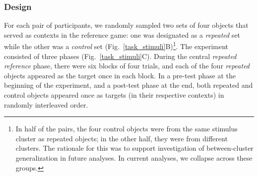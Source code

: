 \documentclass[10pt,letterpaper]{article}
\begin{document}


\subsubsection{Design}
For each pair of participants, we randomly sampled two sets of four objects that served as contexts in the reference game: one was designated as a \emph{repeated} set while the other was a \emph{control} set (Fig.~\ref{task_stimuli}B)\footnote{In half of the pairs, the four control objects were from the same stimulus cluster as repeated objects; in the other half, they were from different clusters. The rationale for this was to support investigation of between-cluster generalization in future analyses. In current analyses, we collapse across these groups.}.%
The experiment consisted of three phases (Fig.~\ref{task_stimuli}C).
During the central \textit{repeated reference} phase, there were six blocks of four trials, and each of the four \emph{repeated} objects appeared as the target once in each block.
In a pre-test phase at the beginning of the experiment, and a post-test phase at the end, both repeated and control objects appeared once as targets (in their respective contexts) in randomly interleaved order.
\end{document}
